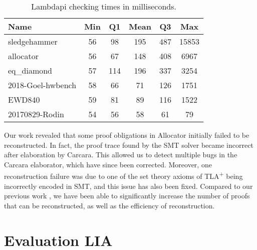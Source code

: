\begin{table}%
    \begin{tabular}{|l c c c c c |}
    \hline
    Name & Min & Q1 & Mean & Q3 & Max \\
    \hline
    sledgehammer & 56 & 98 & 195 & 487 & 15853  \\
    allocator & 56 & 67 & 148 & 408 & 6967 \\
    eq\_diamond & 57 & 114 & 196 & 337 & 3254 \\
    2018-Goel-hwbench & 58 & 66 & 71 & 126 & 1751 \\
    EWD840 & 59 & 81 & 89 & 116 & 1522  \\
    20170829-Rodin & 54 & 56 & 58 & 61 & 79  \\
    \hline
    \end{tabular}
    \caption{Lambdapi checking times in milliseconds.}
    \label{tab:benchmarks-times}
\end{table}


Our work revealed that some proof obligations in Allocator initially failed to be reconstructed. In fact, the proof trace found by the SMT solver became incorrect after elaboration by Carcara. This allowed us to detect multiple bugs in the Carcara elaborator, which have since been corrected.
Moreover, one reconstruction failure was due to one of the set theory axioms of TLA\textsuperscript{+} being incorrectly encoded in SMT, and this issue has also been fixed.
Compared to our previous work \cite{ColtellacciMD24}, we have been able to significantly increase the number of proofs that can be reconstructed, as well as the efficiency of reconstruction.




\section{Evaluation LIA}
\label{sec:evaluation-lia}

